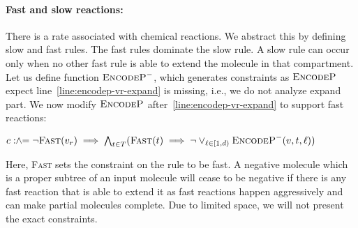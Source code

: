 \paragraph{Fast and slow reactions:}
There is a rate associated with chemical reactions. We abstract this by defining slow and fast rules.
The fast rules dominate the slow rule.
A slow rule can occur only when no other fast rule is able to extend the molecule in that compartment.
Let us define function $\textsc{EncodeP}^-$, which generates constraints as $\textsc{EncodeP}$ expect
line~\ref{line:encodep-vr-expand} is missing, i.e., we do not analyze expand part.
We now modify $\textsc{EncodeP}$ after~\ref{line:encodep-vr-expand} to support fast reactions:\\
\begin{minipage}{1.0\linewidth}
\begin{algorithmic}[1]
  \State $c \mathrel{:\hspace{-3pt}\land\hspace{-3pt}=} \lnot \textsc{Fast}(v_r) \implies 
  \bigwedge_{t \in T} (\textsc{Fast}(t) \implies \lnot\lor_{ {\ell \in [1,d)}} \textsc{EncodeP}^-( v, t, \ell))$
\end{algorithmic}
\end{minipage}
Here, \textsc{Fast} sets the constraint on the rule to be fast.
A negative molecule which is a proper subtree of an input molecule will cease to be negative if there is any fast reaction that is able to extend it as fast reactions happen aggressively and can make partial molecules complete. Due to limited space, we will not present the exact constraints.


